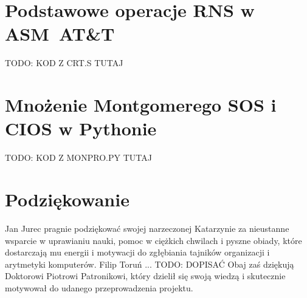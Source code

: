 \documentclass[10pt,journal,compsoc]{IEEEtran}
\begin{document}

%


\appendices
\section{Podstawowe operacje RNS w ASM~AT\&T}
TODO: KOD Z CRT.S TUTAJ

\section{Mnożenie Montgomerego SOS i CIOS w Pythonie}
TODO: KOD Z MONPRO.PY TUTAJ


\section*{Podziękowanie}

Jan Jurec pragnie podziękować swojej narzeczonej Katarzynie za nieustanne wsparcie w uprawianiu nauki, pomoc w ciężkich chwilach i pyszne obiady, które dostarczają mu energii i motywacji do zgłębiania tajników organizacji i arytmetyki komputerów.
Filip Toruń ... TODO: DOPISAĆ
Obaj zaś dziękują Doktorowi Piotrowi Patronikowi, który dzielił się swoją wiedzą i skutecznie motywował do udanego przeprowadzenia projektu.
\end{document}
